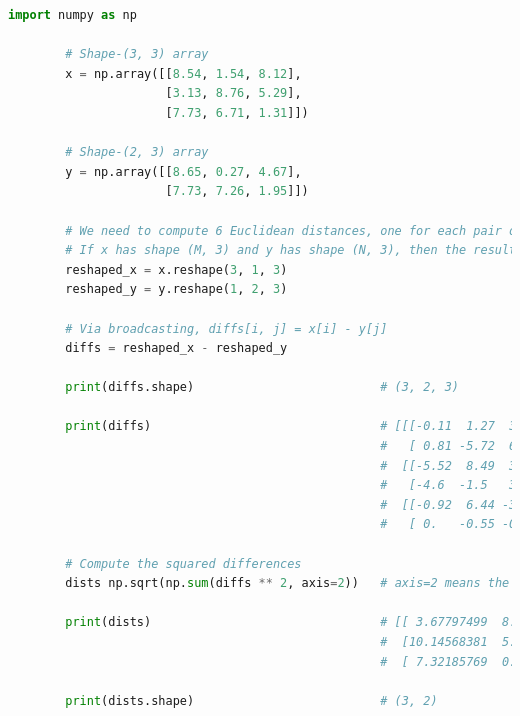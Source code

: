 \documentclass{book}
\begin{document}
\begin{lstlisting}[language=Python, basicstyle=\ttfamily\small, keywordstyle=\color{blue}, commentstyle=\color{forestgreen}, stringstyle=\color{red}, showstringspaces=false]
        import numpy as np

        # Shape-(3, 3) array
        x = np.array([[8.54, 1.54, 8.12],
                      [3.13, 8.76, 5.29],
                      [7.73, 6.71, 1.31]])

        # Shape-(2, 3) array
        y = np.array([[8.65, 0.27, 4.67],
                      [7.73, 7.26, 1.95]])

        # We need to compute 6 Euclidean distances, one for each pair of rows from x and y
        # If x has shape (M, 3) and y has shape (N, 3), then the result should have shape (M, N)
        reshaped_x = x.reshape(3, 1, 3)
        reshaped_y = y.reshape(1, 2, 3)

        # Via broadcasting, diffs[i, j] = x[i] - y[j]
        diffs = reshaped_x - reshaped_y

        print(diffs.shape)                          # (3, 2, 3)

        print(diffs)                                # [[[-0.11  1.27  3.45]
                                                    #   [ 0.81 -5.72  6.17]]
                                                    #  [[-5.52  8.49  3.34]
                                                    #   [-4.6  -1.5   3.34]]
                                                    #  [[-0.92  6.44 -3.36]
                                                    #   [ 0.   -0.55 -0.64]]]

        # Compute the squared differences
        dists np.sqrt(np.sum(diffs ** 2, axis=2))   # axis=2 means the column axis

        print(dists)                                # [[ 3.67797499  8.45241977]
                                                    #  [10.14568381  5.87925165]
                                                    #  [ 7.32185769  0.84386018]]

        print(dists.shape)                          # (3, 2)
\end{lstlisting}
\end{document}
